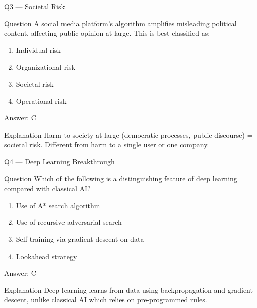 \documentclass[aspectratio=169,8pt]{beamer}
\begin{document}
	\begin{frame}{Q3 --- Societal Risk}
		\begin{block}{Question}
			A social media platform's algorithm amplifies misleading political content, affecting public opinion at large. This is best classified as:
		\end{block}
		\begin{enumerate}
			\item Individual risk
			\item Organizational risk
			\item Societal risk
			\item Operational risk
		\end{enumerate}
		\begin{exampleblock}{Answer: C}\end{exampleblock}
		\begin{block}{Explanation}
			Harm to society at large (democratic processes, public discourse) = societal risk. Different from harm to a single user or one company.
		\end{block}
	\end{frame}
	
	\begin{frame}{Q4 --- Deep Learning Breakthrough}
		\begin{block}{Question}
			Which of the following is a distinguishing feature of deep learning compared with classical AI?
		\end{block}
		\begin{enumerate}
			\item Use of A* search algorithm
			\item Use of recursive adversarial search
			\item Self-training via gradient descent on data
			\item Lookahead strategy
		\end{enumerate}
		\begin{exampleblock}{Answer: C}\end{exampleblock}
		\begin{block}{Explanation}
			Deep learning learns from data using backpropagation and gradient descent, unlike classical AI which relies on pre-programmed rules.
		\end{block}
	\end{frame}
	
\end{document}
